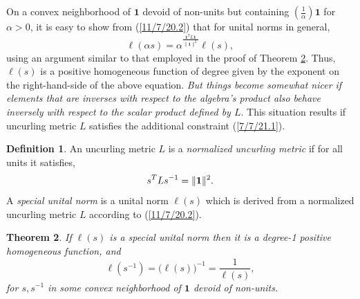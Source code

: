 \documentclass{amsart}
\numberwithin{equation}{section}
\newtheorem{theorem}{Theorem}
\theoremstyle{definition}
\newtheorem{definition}[theorem]{Definition}
\numberwithin{theorem}{section}
\begin{document}
On a convex neighborhood of $\mathbf{1}$ devoid of non-units but containing $\left(\frac{1}{\alpha}\right)\mathbf{1}$ for $\alpha>0$, it is easy to show from (\ref{11/7/20.2}) that for unital norms in general, \[  \ell(\alpha s) = \alpha^{\frac{\mathbf{1}^T L \mathbf{1}}{\|\mathbf{1}\|^2}} \ell(s),\] using an argument similar to that employed in the proof of Theorem \ref{9/24/23.1}. Thus, $ \ell(s)$ is a positive homogeneous function of degree given by the exponent on the right-hand-side of the above equation.  
   {\it But things become somewhat nicer if elements that are inverses with respect to the algebra's product also behave inversely with respect to the scalar product defined by $L$}.  
    This situation results if uncurling metric $L$ satisfies the additional constraint (\ref{7/7/21.1}).
 
\begin{definition}\label{9/20/23.1} An uncurling metric $L$ is a {\it normalized uncurling metric} if for all units it satisfies, \begin{equation} \label{7/7/21.1} s^TLs^{-1} =\|{\bf 1}\|^2.\end{equation}  A {\it special unital norm} is a unital norm $ \ell(s)$ which is derived from a normalized uncurling metric $L$ according to (\ref{11/7/20.2}). 
\end{definition}

\begin{theorem}\label{9/24/23.1} If $ \ell(s)$ is a special unital norm then it is a degree-1 positive homogeneous function, and
\begin{equation}\label{5/23/23.3}  \ell(s^{-1}) = \big(\ell(s)\big)^{-1} = \frac{1}{\ell(s)}, \end{equation} for $s,s^{-1}$ in some convex neighborhood of $\mathbf{1}$ devoid of non-units. \end{theorem}
\end{document}

